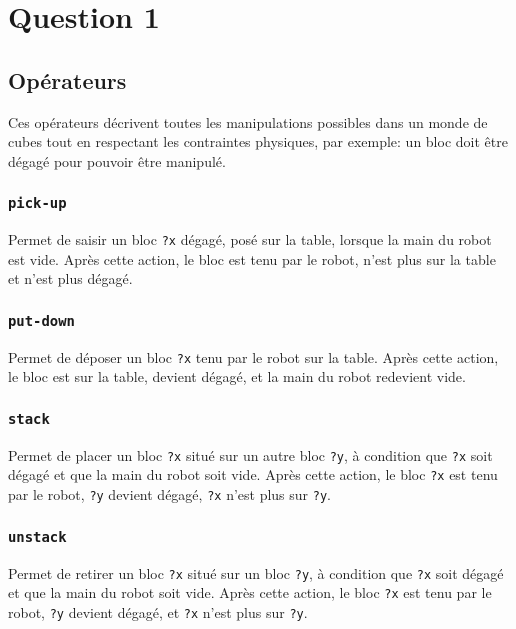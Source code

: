 \documentclass[../CSC_5RO16_TA_TP5.tex]{subfiles}
\begin{document}
\section{Question 1}
% 


\subsection{Opérateurs}
\noindent Ces opérateurs décrivent toutes les manipulations possibles dans un monde de cubes tout en respectant les contraintes physiques, par exemple: un bloc doit être dégagé pour pouvoir être manipulé.

\subsubsection{\texttt{pick-up}}
\begin{resolution}
    Permet de saisir un bloc \texttt{?x} dégagé, posé sur la table, lorsque la main du robot est vide. Après cette action, le bloc est tenu par le robot, n'est plus sur la table et n'est plus dégagé.
\end{resolution}

\subsubsection{\texttt{put-down}}
\begin{resolution}
    Permet de déposer un bloc \texttt{?x} tenu par le robot sur la table. Après cette action, le bloc est sur la table, devient dégagé, et la main du robot redevient vide.
\end{resolution}

\subsubsection{\texttt{stack}}
\begin{resolution}
    Permet de placer un bloc \texttt{?x} situé sur un autre bloc \texttt{?y}, à condition que \texttt{?x} soit dégagé et que la main du robot soit vide. Après cette action, le bloc \texttt{?x} est tenu par le robot, \texttt{?y} devient dégagé, \texttt{?x} n'est plus sur \texttt{?y}.
\end{resolution}

\subsubsection{\texttt{unstack}}
\begin{resolution}
    Permet de retirer un bloc \texttt{?x} situé sur un bloc \texttt{?y}, à condition que \texttt{?x} soit dégagé et que la main du robot soit vide. Après cette action, le bloc \texttt{?x} est tenu par le robot, \texttt{?y} devient dégagé, et \texttt{?x} n'est plus sur \texttt{?y}.
\end{resolution}
\end{document}
